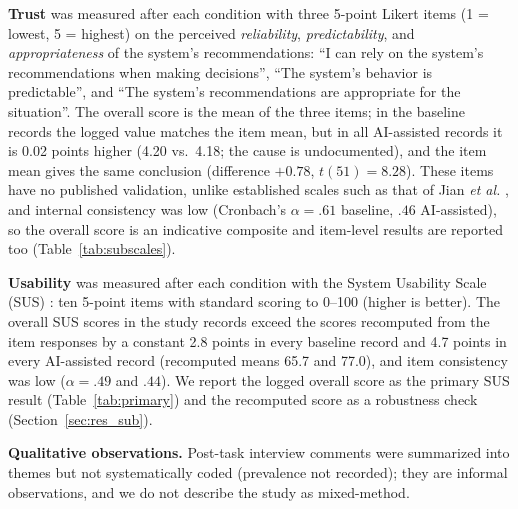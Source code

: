\documentclass[journal]{IEEEtran}
\theoremstyle{plain}
\theoremstyle{definition}
\begin{document}
    \textbf{Trust} was measured after each condition with three 5-point Likert items (1 = lowest, 5 = highest) on the perceived \emph{reliability}, \emph{predictability}, and \emph{appropriateness} of the system's recommendations: ``I can rely on the system's recommendations when making decisions'', ``The system's behavior is predictable'', and ``The system's recommendations are appropriate for the situation''. The overall score is the mean of the three items; in the baseline records the logged value matches the item mean, but in all AI-assisted records it is 0.02 points higher (4.20 vs.\ 4.18; the cause is undocumented), and the item mean gives the same conclusion (difference $+0.78$, $t(51)=8.28$). These items have no published validation, unlike established scales such as that of Jian \emph{et al.} \cite{Jian2000}, and internal consistency was low (Cronbach's $\alpha = .61$ baseline, $.46$ AI-assisted), so the overall score is an indicative composite and item-level results are reported too (Table~\ref{tab:subscales}).

    \textbf{Usability} was measured after each condition with the System Usability Scale (SUS) \cite{Brooke1996}: ten 5-point items with standard scoring to 0--100 (higher is better). The overall SUS scores in the study records exceed the scores recomputed from the item responses by a constant 2.8 points in every baseline record and 4.7 points in every AI-assisted record (recomputed means 65.7 and 77.0), and item consistency was low ($\alpha = .49$ and $.44$). We report the logged overall score as the primary SUS result (Table~\ref{tab:primary}) and the recomputed score as a robustness check (Section~\ref{sec:res_sub}).

    \textbf{Qualitative observations.} Post-task interview comments were summarized into themes but not systematically coded (prevalence not recorded); they are informal observations, and we do not describe the study as mixed-method.
\end{document}
